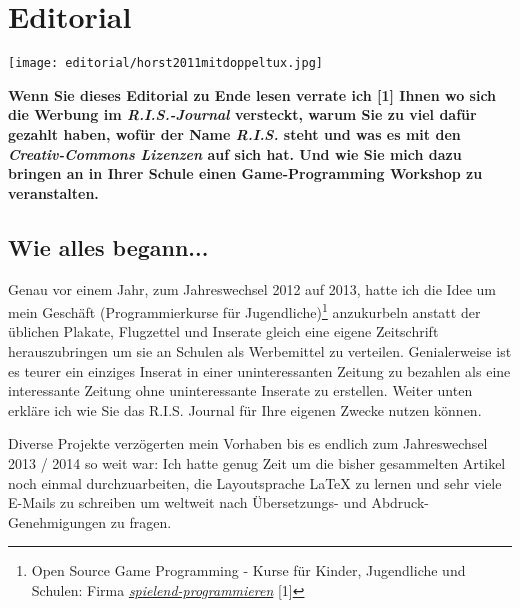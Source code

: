 \section*{Editorial} 
\hypertarget{editorial}{}
\label{editorial}

\begin{figu}
\texttt{[image: editorial/horst2011mitdoppeltux.jpg]}\\ 
\caption{Horst JENS [1]}
\end{figu}   
\textbf{Wenn Sie dieses Editorial zu Ende lesen verrate ich [1] Ihnen wo sich die Werbung im \textit{R.I.S.-Journal} versteckt, warum Sie zu viel daf\"ur gezahlt haben, wof\"ur der Name \textit{R.I.S.} steht und was es mit den \textit{Creativ-Commons Lizenzen} auf sich hat. Und wie Sie mich dazu bringen an in Ihrer Schule einen Game-Programming Workshop zu veranstalten.} 


\subsection*{Wie alles begann...}
Genau vor einem Jahr, zum Jahreswechsel 2012 auf 2013, hatte ich die Idee um mein Geschäft (Programmierkurse für Jugendliche)\footnote{Open Source Game Programming - Kurse für Kinder, Jugendliche und Schulen: Firma \href{http://spielend-programmieren.at}{\textit{spielend-programmieren}} [1]} anzukurbeln anstatt der üblichen Plakate, Flugzettel und Inserate gleich eine eigene Zeitschrift herauszubringen um sie an Schulen als Werbemittel zu verteilen. Genialerweise ist es teurer ein einziges Inserat in einer uninteressanten Zeitung zu bezahlen als eine interessante Zeitung ohne uninteressante Inserate zu erstellen. Weiter unten erkläre ich wie Sie das R.I.S. Journal für Ihre eigenen Zwecke nutzen können.

Diverse Projekte verzögerten mein Vorhaben bis es endlich zum Jahreswechsel 2013 / 2014 so weit war: Ich hatte genug Zeit um die bisher gesammelten Artikel noch einmal durchzuarbeiten, die Layoutsprache {\large \LaTeX} zu lernen und sehr viele E-Mails zu schreiben um weltweit nach Übersetzungs- und Abdruck-Genehmigungen zu fragen. 

